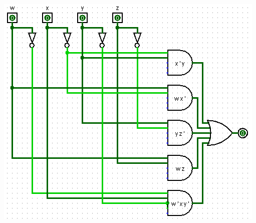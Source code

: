 \documentclass{article}
\begin{document}
\begin{enumerate}[label=\arabic*]
    \includegraphics[scale=.72]{G.PNG} \\
    


\end{enumerate}
\end{document}
